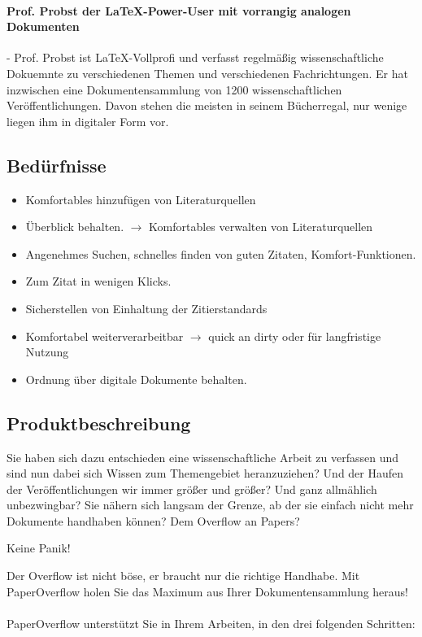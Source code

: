 \documentclass[a4paper,12pt]{article}
\begin{document}
\paragraph{Prof. Probst der LaTeX-Power-User mit vorrangig analogen Dokumenten}
- Prof. Probst ist LaTeX-Vollprofi und verfasst regelmäßig wissenschaftliche Dokuemnte zu verschiedenen Themen und verschiedenen Fachrichtungen. Er hat inzwischen eine Dokumentensammlung von 1200 wissenschaftlichen Veröffentlichungen. Davon stehen die meisten in seinem Bücherregal, nur wenige liegen ihm in digitaler Form vor.

\subsection{Bedürfnisse}
\begin{itemize}
\item Komfortables hinzufügen von Literaturquellen
\item Überblick behalten. $\to$ Komfortables verwalten von Literaturquellen
\item Angenehmes Suchen, schnelles finden von guten Zitaten, Komfort-Funktionen.
\item Zum Zitat in wenigen Klicks.
\item Sicherstellen von Einhaltung der Zitierstandards
\item Komfortabel weiterverarbeitbar $\to$ quick an dirty oder für langfristige Nutzung
\item Ordnung über digitale Dokumente behalten.
\end{itemize}

\subsection{Produktbeschreibung}

Sie haben sich dazu entschieden eine wissenschaftliche Arbeit zu verfassen und sind nun dabei sich Wissen zum Themengebiet heranzuziehen? Und der Haufen der Veröffentlichungen wir immer größer und größer? Und ganz allmählich unbezwingbar? Sie nähern sich langsam der Grenze, ab der sie einfach nicht mehr Dokumente handhaben können? Dem Overflow an Papers? 
\begin{center}
Keine Panik! 
\end{center}
Der Overflow ist nicht böse, er braucht nur die richtige Handhabe. Mit PaperOverflow holen Sie das Maximum aus Ihrer Dokumentensammlung heraus!\\ \\
PaperOverflow unterstützt Sie in Ihrem Arbeiten, in den drei folgenden Schritten:
\end{document}
